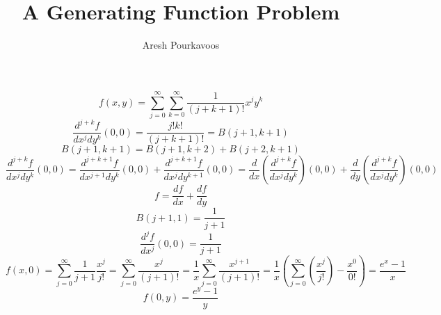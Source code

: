 \documentclass{article}
\begin{document}
\title{A Generating Function Problem}
\author{Aresh Pourkavoos}
\maketitle

\[f(x, y) = \sum_{j=0}^\infty\sum_{k=0}^\infty\frac{1}{(j+k+1)!}x^jy^k\]
\[\frac{d^{j+k}f}{dx^jdy^k}(0, 0) = \frac{j!k!}{(j+k+1)!} = B(j+1, k+1)\]
\[B(j+1, k+1) = B(j+1, k+2) + B(j+2, k+1)\]
\[\frac{d^{j+k}f}{dx^jdy^k}(0, 0)
= \frac{d^{j+k+1}f}{dx^{j+1}dy^k}(0, 0)
+ \frac{d^{j+k+1}f}{dx^jdy^{k+1}}(0, 0)
= \frac{d}{dx}\left(\frac{d^{j+k}f}{dx^jdy^k}\right)(0, 0)
+ \frac{d}{dy}\left(\frac{d^{j+k}f}{dx^jdy^k}\right)(0, 0)\]
\[f = \frac{df}{dx}+\frac{df}{dy}\]
\[B(j+1, 1) = \frac{1}{j+1}\]
\[\frac{d^jf}{dx^j}(0, 0) = \frac{1}{j+1}\]
\[f(x, 0) = \sum_{j=0}^\infty \frac{1}{j+1}\frac{x^j}{j!}
= \sum_{j=0}^\infty \frac{x^j}{(j+1)!}
= \frac{1}{x} \sum_{j=0}^\infty \frac{x^{j+1}}{(j+1)!}
= \frac{1}{x} \left(\sum_{j=0}^\infty \left(\frac{x^j}{j!}\right)-\frac{x^0}{0!}\right)
= \frac{e^x-1}{x}\]
\[f(0, y) = \frac{e^y-1}{y}\]
\end{document}
